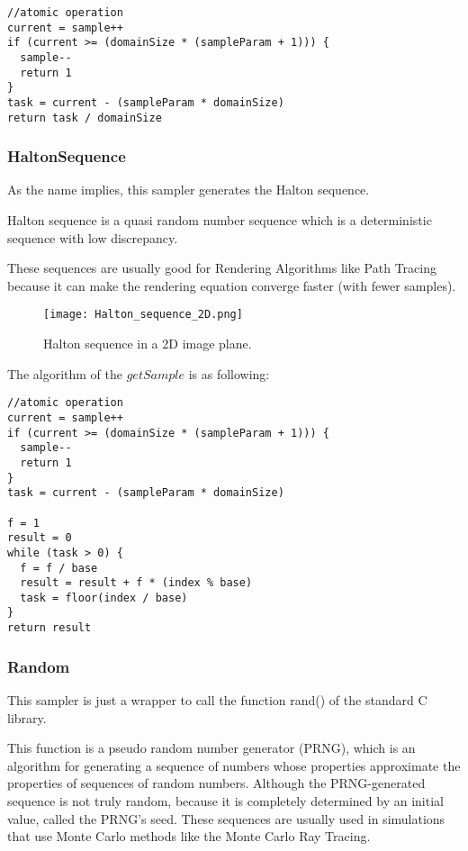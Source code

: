 \begin{lstlisting}
//atomic operation
current = sample++
if (current >= (domainSize * (sampleParam + 1))) {
  sample--
  return 1
}
task = current - (sampleParam * domainSize)
return task / domainSize
\end{lstlisting}


\subsubsection{HaltonSequence}

\par
As the name implies, this sampler generates the Halton sequence.

\par
Halton sequence is a quasi random number sequence which is a deterministic sequence with low discrepancy.

These sequences are usually good for Rendering Algorithms like Path Tracing because it can make the rendering equation converge faster (with fewer samples).

\begin{figure}[H]
	\centering
	\caption{Halton sequence in a 2D image plane.}
	\label{Halton_sequence_2D.}
	\texttt{[image: Halton\_sequence\_2D.png]}
\end{figure}

\par
The algorithm of the
$getSample$
is as following:

\begin{lstlisting}
//atomic operation
current = sample++
if (current >= (domainSize * (sampleParam + 1))) {
  sample--
  return 1
}
task = current - (sampleParam * domainSize)

f = 1
result = 0
while (task > 0) {
  f = f / base
  result = result + f * (index % base)
  task = floor(index / base)
}
return result
\end{lstlisting}

\subsubsection{Random}

\par
This sampler is just a wrapper to call the function rand() of the standard C library.

This function is a pseudo random number generator (PRNG), which is an algorithm for generating a sequence of numbers whose properties approximate the properties of sequences of random numbers.
Although the PRNG-generated sequence is not truly random, because it is completely determined by an initial value, called the PRNG's seed.
These sequences are usually used in simulations that use Monte Carlo methods like the Monte Carlo Ray Tracing.

